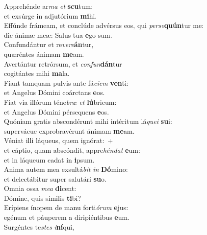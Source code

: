 \evenverse Apprehénde ar\textit{ma} \textit{et} \textbf{scu}tum:~\*\\
\evenverse et exsúrge in adjutórium \textbf{mi}hi.\\
\oddverse Effúnde frámeam, et conclúde advérsus eos, qui \textit{per}\textit{se}\textbf{quún}tur me:~\*\\
\oddverse dic ánimæ meæ: Salus tua \textbf{e}go sum.\\
\evenverse Confundántur et re\textit{ve}\textit{re}\textbf{án}tur,~\*\\
\evenverse quæréntes ánimam \textbf{me}am.\\
\oddverse Avertántur retrórsum, et \textit{con}\textit{fun}\textbf{dán}tur~\*\\
\oddverse cogitántes mihi \textbf{ma}la.\\
\evenverse Fiant tamquam pulvis ante fá\textit{ci}\textit{em} \textbf{ven}ti:~\*\\
\evenverse et Angelus Dómini coárctans \textbf{e}os.\\
\oddverse Fiat via illórum téne\textit{bræ} \textit{et} \textbf{lú}bricum:~\*\\
\oddverse et Angelus Dómini pérsequens \textbf{e}os.\\
\evenverse Quóniam gratis abscondérunt mihi intéritum lá\textit{que}\textit{i} \textbf{su}i:~\*\\
\evenverse supervácue exprobravérunt ánimam \textbf{me}am.\\
\oddverse Véniat illi láqueus, quem ignórat:~+\\
\oddverse  et cáptio, quam abscóndit, appre\textit{hén}\textit{dat} \textbf{e}um:~\*\\
\oddverse et in láqueum cadat in \textbf{i}psum.\\
\evenverse Anima autem mea exsultá\textit{bit} \textit{in} \textbf{Dó}mino:~\*\\
\evenverse et delectábitur super salutári \textbf{su}o.\\
\oddverse Omnia ossa \textit{me}\textit{a} \textbf{di}cent:~\*\\
\oddverse Dómine, quis símilis \textbf{ti}bi?\\
\evenverse Erípiens ínopem de manu forti\textit{ó}\textit{rum} \textbf{e}jus:~\*\\
\evenverse egénum et páuperem a diripiéntibus \textbf{e}um.\\
\oddverse Surgéntes te\textit{stes} \textit{i}\textbf{ní}qui,~\*\\
